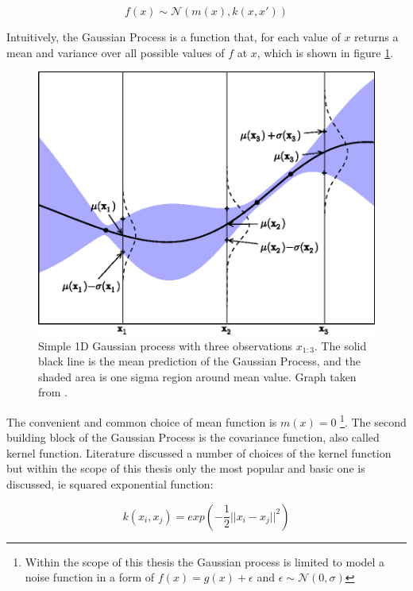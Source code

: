 \begin{equation}
    f(x) \sim  \mathcal{N} \left( m(x), k(x,x')  \right)
\end{equation}

Intuitively, the Gaussian Process is a function that, for each value of $x$ returns a mean and variance over all possible values of $f$ at $x$, which is shown in figure \ref{fig:GP}.  

\begin{figure}
\centering
\includegraphics[scale=0.7]{figures/GaussianProcess.png}
\caption{ Simple 1D Gaussian process with three observations $x_{1:3}$. The solid black line is the mean prediction of the Gaussian Process, and the shaded area is one sigma region around mean value.   
Graph taken from \cite{BayesianOpt}.
\label{fig:GP}}
\end{figure}

The convenient and common choice of mean function is $m(x) = 0$ \footnote{ Within the scope of this thesis the Gaussian process is limited to model a noise function in a form of $f(x) = g(x) + \epsilon$ and $\epsilon \sim \mathcal{N}(0, \sigma)$ }. 
The second building block of the Gaussian Process is the covariance function, also called kernel function. Literature discussed a number of choices of the kernel function but within the scope of this thesis only the most popular and basic one is discussed, ie squared exponential function: 

\begin{equation}
\label{eq:kernel_function}
    k(x_i,x_j) = exp\left( - \frac{1}{2} ||x_i - x_j||^2 \right)
\end{equation}


